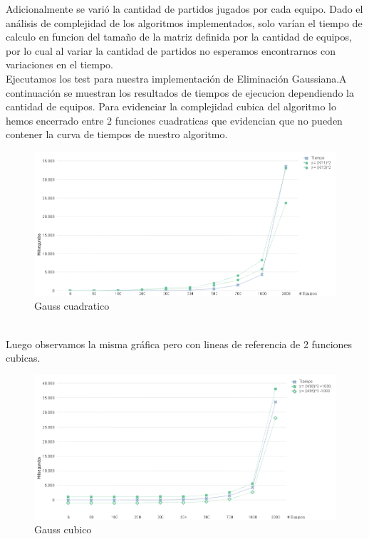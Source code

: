 Adicionalmente se varió la cantidad de partidos jugados por cada equipo. Dado el análisis de complejidad de los algoritmos implementados, solo varían el tiempo de calculo en 
funcion del tamaño de la matriz definida por la cantidad de equipos, por lo cual al variar la cantidad de partidos no esperamos encontrarnos con variaciones en el tiempo. \\

Ejecutamos los test para nuestra implementación de Eliminación Gaussiana.A continuación se muestran los resultados de tiempos de ejecucion dependiendo la cantidad de equipos.
Para evidenciar la complejidad cubica del algoritmo lo hemos encerrado entre 2 funciones cuadraticas que evidencian que no pueden contener la curva de tiempos de nuestro algoritmo. \\


\begin{figure}[H]
\centering
\includegraphics[width=1\textwidth]{IMG/gauss cuadrativo.png}
\caption{Gauss cuadratico}
\label{fig:Gauss cuadratico}
\end{figure}

\\

Luego observamos la misma gráfica pero con lineas de referencia de 2 funciones cubicas. \\

\begin{figure}[H]
\centering
\includegraphics[width=1\textwidth]{IMG/gauss cubico.png}
\caption{Gauss cubico}
\label{fig:Gauss cubico}
\end{figure}

